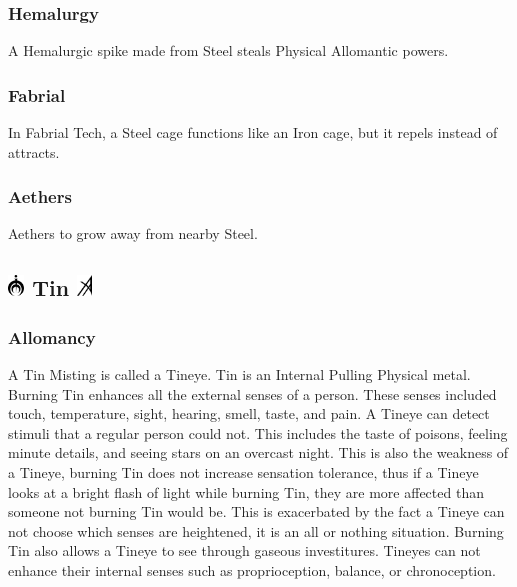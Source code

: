 \documentclass[conference]{IEEEtran}
\newcommand{\n}{\hfill\break}
\begin{document}
\subsubsection*{\textbf{Hemalurgy}}
A Hemalurgic spike made from Steel steals Physical Allomantic powers.\cite{HE-TB}\\
\subsubsection*{\textbf{Fabrial}}
In Fabrial Tech, a Steel cage functions like an Iron cage, but it repels instead of attracts.\cite{RoW-E11}\n
\subsubsection*{\textbf{Aethers}}
Aethers to grow away from nearby Steel.\cite{ToES-CH26}
\newpage
\subsection*{\includegraphics[height=1em]{images/Tin.png}  \textbf{Tin} \includegraphics[height=1em]{images/Tin_(Feruchemy).png}}
\subsubsection*{\textbf{Allomancy}}
A Tin Misting is called a Tineye.\cite{ARS}  Tin is an Internal Pulling Physical metal.  Burning Tin enhances all the external senses of a person.\cite{AL-TB}  These senses included touch, temperature, sight, hearing, smell, taste, and pain.\cite{ARS}  A Tineye can detect stimuli that a regular person could not.  This includes the taste of poisons,\cite{WoA-CH18} feeling minute details, and seeing stars on an overcast night.\cite{TFE-CH7}  This is also the weakness of a Tineye, burning Tin does not increase sensation tolerance, thus if a Tineye looks at a bright flash of light while burning Tin,\cite{TFE-CH7} they are more affected than someone not burning Tin would be.  This is exacerbated by the fact a Tineye can not choose which senses are heightened,\cite{TFE-CH32} it is an all or nothing situation.  Burning Tin also allows a Tineye to see through gaseous investitures.
\cite{tin-shroud}\cite{TFE-CH7}  Tineyes can not enhance their internal senses such as proprioception, balance, or chronoception.\cite{HoA-CH41}\\
\end{document}
